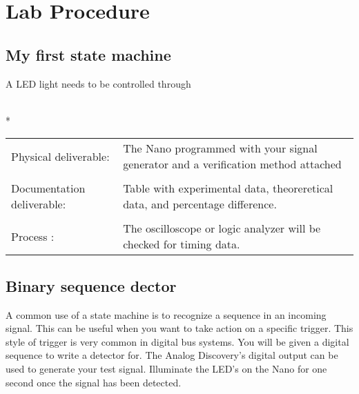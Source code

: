       \clearpage
      
\section{ Lab Procedure}
  \subsection{My first state machine}
  A LED light needs to be controlled through 

    \vspace{15px}
    \begin{centering}
      \begin{fminipage}{.43\textwidth}
        \vspace{3px}
        \\*
        \vspace{10px}
        \begin{tabular}{p{1.8cm}  p{5.4cm}}
          \raggedright Physical deliverable:                         & The Nano programmed with your signal generator and a verification method attached\\
          \\
          \raggedright Documentation deliverable:          & Table with experimental data, theoreretical data, and percentage difference. \\
          \\
          Process :                                                                            &The oscilloscope or logic analyzer will be checked for timing data.
        \end{tabular}
      \end{fminipage}
    \end{centering} 

  \subsection{Binary sequence dector}
    A common use of a state machine is to recognize a sequence in an incoming signal. This can be useful when you want to take action on a specific trigger. This style of trigger is very common in digital bus systems. You will be given a digital sequence to write a detector for. The Analog Discovery's  digital output can be used to generate your test signal. Illuminate the LED's on the  Nano for one second once the signal has been detected.

